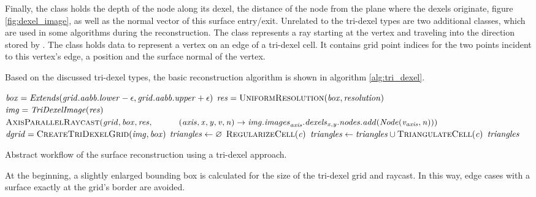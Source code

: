 Finally, the  class holds the depth of the node along its dexel, \ie the distance of the node from the plane where the dexels originate, \cf figure \ref{fig:dexel_image}, as well as the normal vector of this surface entry/exit.
Unrelated to the tri-dexel types are two additional classes, which are used in some algorithms during the reconstruction.
The  class represents a ray starting at the vertex  and traveling into the direction stored by .
The  class holds data to represent a vertex on an edge of a tri-dexel cell.
It contains grid point indices for the two points incident to this vertex's edge, a position and the surface normal of the vertex.

Based on the discussed tri-dexel types, the basic reconstruction algorithm is shown in algorithm \ref{alg:tri_dexel}.
%
\begin{algorithm}
	\centering
	\begin{algorithmic}[1]
			\State $\mathit{box} = \mathit{Extends}(\mathit{grid}.\mathit{aabb}.\mathit{lower} - \epsilon, \mathit{grid}.\mathit{aabb}.\mathit{upper} + \epsilon)$
			\State $\var{res} = \Call{UniformResolution}{\var{box}, \var{resolution}}$
			\State {}
		\EndFunction
		\\
			\State $\mathit{img} = \mathit{TriDexelImage}(\mathit{res})$ \label{alg:line:tri_dexel_begin}
			\State $\Call{AxisParallelRaycast}{\var{grid}, \var{box}, \var{res},\hfill\break
				\hspace*{\dimexpr\algorithmicindent*2}(\var{axis}, \var{x}, \var{y}, \var{v}, \var{n}) \rightarrow \var{img}.\var{images}_{\var{axis}}.\var{dexels}_{\var{x}, \var{y}}.\var{nodes}.\var{add}(\var{Node}(\var{v}_{\var{axis}}, \var{n}))}$
			\State $\var{dgrid} = \Call{CreateTriDexelGrid}{\var{img}, \var{box}}$
			\State $\mathit{triangles} \gets \varnothing$
				\State $\Call{RegularizeCell}{\var{c}}$
				\State $\var{triangles} \gets \var{triangles} \cup \Call{TriangulateCell}{\var{c}}$
			\EndFor
			\State \Return $\mathit{triangles}$
		\EndFunction
	\end{algorithmic}
	\caption{
		Abstract workflow of the surface reconstruction using a tri-dexel approach.
	}
	\label{alg:tri_dexel}
\end{algorithm}
%
At the beginning, a slightly enlarged bounding box is calculated for the size of the tri-dexel grid and raycast.
In this way, edge cases with a surface exactly at the grid's border are avoided.
